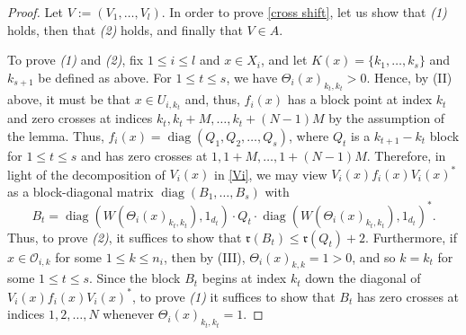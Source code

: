 \documentclass[12pt]{amsart}
\numberwithin{equation}{section}
\theoremstyle{definition}
\theoremstyle{remark}
\newcommand{\diag}{\operatorname{diag}}
\begin{document}
\begin{proof}
	Let $V:=(V_{1},\ldots,V_{ l })$. In order to prove \autoref{cross shift}, let us show that \textit{(1)} holds, then that \textit{(2)} holds, and finally that $V\in A$. 
	
	To prove \textit{(1)} and \textit{(2)}, fix $1\leq i\leq  l $ and $x\in X_{i}$, and let $K(x)=\{k_{1},\ldots,k_{s}\}$ and $k_{s+1}$ be defined as above. For $1\leq t\leq s$, we have $\Theta_{i}(x)_{k_{t},k_{t}}>0$. Hence, by (II) above, it must be that $x\in U_{i,k_{t}}$ and, thus, $f_{i}(x)$ has a block point at index $k_{t}$ and zero crosses at indices $k_{t},k_{t}+M,\ldots,k_{t}+(N-1)M$ by the assumption of the lemma. Thus, $f_{i}(x)=\diag(Q_{1},Q_{2},\ldots,Q_{s})$, where $Q_{t}$ is a $k_{t+1}-k_{t}$ block for $1\leq t\leq s$ and has zero crosses at $1,1+M,\ldots,1+(N-1)M$. Therefore, in light of the decomposition of $V_{i}(x)$ in \autoref{Vi}, we may view $V_{i}(x)f_{i}(x)V_{i}(x)^{*}$ as a block-diagonal matrix $\diag(B_{1},\ldots,B_{s})$ with
	$$
	B_{t}=\diag(W(\Theta_{i}(x)_{k_{t},k_{t}}),1_{d_{t}})\cdot Q_{t}\cdot\diag(W(\Theta_{i}(x)_{k_{t},k_{t}}),1_{d_{t}})^{*}.
	$$
	Thus, to prove \textit{(2)}, it suffices to show that $\mathfrak{r}(B_{t})\leq\mathfrak{r}(Q_{t})+2$. Furthermore, if $x\in \mathcal{O}_{i,k}$ for some $1\leq k\leq n_{i}$, then by (III), $\Theta_{i}(x)_{k,k}=1>0$, and so $k=k_{t}$ for some $1\leq t\leq s$. Since the block $B_{t}$ begins at index $k_{t}$ down the diagonal of $V_{i}(x)f_{i}(x)V_{i}(x)^{*}$, to prove \textit{(1)} it suffices to show that $B_{t}$ has zero crosses at indices $1, 2,\ldots,N$ whenever $\Theta_{i}(x)_{k_{t},k_{t}}=1$. 
	

\end{proof}
\end{document}
